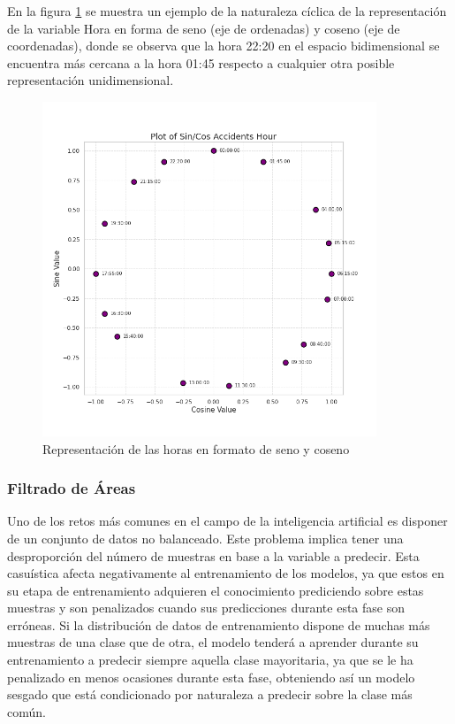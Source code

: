 En la figura \ref{HoursPlot} se muestra un ejemplo de la naturaleza cíclica de la representación de la variable Hora en forma de seno (eje de ordenadas) y coseno (eje de coordenadas), donde se observa que la hora 22:20 en el espacio bidimensional se encuentra más cercana a la hora 01:45 respecto a cualquier otra posible representación unidimensional.

\begin{figure}[h]
	\centering
	\includegraphics[width=10cm]{Figures/normal_plot.png}
	\caption{Representación de las horas en formato de seno y coseno}
	\label{HoursPlot}
\end{figure}

\subsubsection{Filtrado de Áreas}

Uno de los retos más comunes en el campo de la inteligencia artificial es disponer de un conjunto de datos no balanceado. Este problema implica tener una desproporción del número de muestras en base a la variable a predecir. Esta casuística afecta negativamente al entrenamiento de los modelos, ya que estos en su etapa de entrenamiento adquieren el conocimiento prediciendo sobre estas muestras y son penalizados cuando sus predicciones durante esta fase son erróneas. Si la distribución de datos de entrenamiento dispone de muchas más muestras de una clase que de otra, el modelo tenderá a aprender durante su entrenamiento a predecir siempre aquella clase mayoritaria, ya que se le ha penalizado en menos ocasiones durante esta fase, obteniendo así un modelo sesgado que está condicionado por naturaleza a predecir sobre la clase más común.


